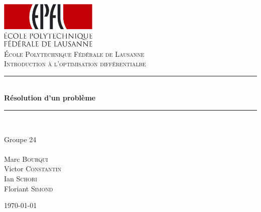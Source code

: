 \newcommand{\HRule}{\rule{\linewidth}{0.5mm}}

\begin{titlepage}

\begin{center}


\includegraphics[width=0.35\textwidth]{./images/epfl}\\[1cm]    

\textsc{\LARGE École Polytechnique Fédérale de Lausanne}\\[1.5cm]

\textsc{\Large Introduction à l'optimisation différentialbe}\\[0.5cm]


\HRule \\[0.4cm]
{ \huge \bfseries Résolution d'un problème}\\[0.4cm]

\HRule \\[1.5cm]


\begin{center}
Groupe 24\\
\ \\
Marc \textsc{Bourqui} \\ Victor \textsc{Constantin} \\ Ian \textsc{Schori} \\ Floriant \textsc{Simond}
\end{center}

\vfill

{\large \today}

\end{center}

\end{titlepage}
